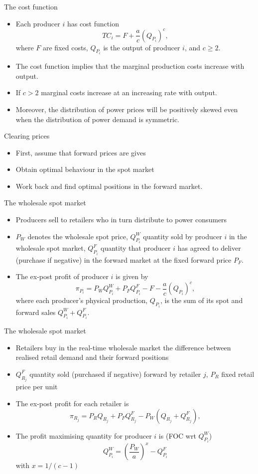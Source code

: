 {The cost function}
\begin{itemize}
\item<1-> Each producer $i$ has cost function
$$
TC_i=F+\frac{a}{c}(Q_{P_i})^c,
$$
where $F$ are fixed costs, $Q_{P_i}$ is the output of producer $i$, and $c\geq 2$.
\item<2-> The cost function implies that the marginal production costs increase with output.
\item<3-> If $c>2$ marginal costs increase at an increasing rate with output.
\item<4-> Moreover, the distribution of power prices will be positively skewed even when the distribution of power demand is symmetric.
\end{itemize}



{Clearing prices}
\begin{itemize}
\item<1-> First, assume that forward prices are gives
\item<2-> Obtain optimal behaviour in the spot market
\item<3-> Work back and find optimal positions in the forward market.
\end{itemize}



{The wholesale spot market}
\begin{itemize}
\item<1-> Producers sell to retailers who in turn distribute to power consumers
\item<2-> $P_W$ denotes the wholesale spot price, $Q_{P_i}^W$ quantity sold by producer $i$ in the wholesale spot market, $Q_{P_i}^F$ quantity
that producer $i$ has agreed to deliver (purchase if negative) in the forward market at the fixed forward price $P_F$.
\item<3-> The ex-post profit of producer $i$ is given by
$$
\pi_{P_i}=P_W Q_{P_i}^W + P_FQ_{P_i}^F
-F-\frac{a}{c}(Q_{P_i})^c,$$
where each producer's physical production, $Q_{P_i}$, is the sum of its spot and forward sales $Q_{P_i}^W+Q_{P_i}^F$.
\end{itemize}



{The wholesale spot market}
\begin{itemize}
\item<1-> Retailers buy in the real-time wholesale market the difference between realised retail demand and their forward positions
\item<2-> $Q_{R_j}^F$ quantity sold (purchased if negative) forward by retailer $j$, $P_R$ fixed retail price per unit
\item<3-> The ex-post profit for each retailer is
$$
\pi_{R_j}=P_R Q_{R_j} + P_FQ_{R_j}^F - P_W (Q_{R_j}+Q_{R_j}^F),$$
\item<4-> The profit maximising quantity for producer $i$ is (FOC wrt $Q_{P_i}^W$)
$$Q_{P_i}^W=\left(\frac{P_W}{a}\right)^{x}-Q_{P_i}^F$$
with $x=1/(c-1)$
\end{itemize}


